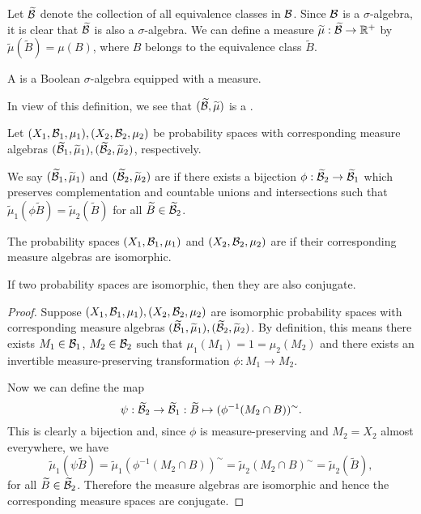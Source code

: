 Let $\widetilde{\mathcal{B}}$ denote the collection of all equivalence classes in $\mathcal{B}$. Since $\mathcal{B}$ is a $\sigma$-algebra, it is clear that $\widetilde{\mathcal{B}}$ is also a $\sigma$-algebra. We can define a measure $\widetilde{\mu} : \widetilde{\mathcal{B}} \to \mathbb{R}^+$ by $\tilde{\mu}(\tilde{B}) = \mu(B)$, where $B$ belongs to the equivalence class $\tilde{B}$.

\begin{definition}
	A  is a Boolean $\sigma$-algebra equipped with a measure.
\end{definition}

In view of this definition, we see that $(\widetilde{\mathcal{B}}, \widetilde{\mu})$ is a .

\begin{definition}
	Let $(X_1, \mathcal{B}_1, \mu_1), (X_2, \mathcal{B}_2, \mu_2)$ be probability spaces with corresponding measure algebras $(\widetilde{\mathcal{B}}_1, \widetilde{\mu}_1), (\widetilde{\mathcal{B}}_2, \widetilde{\mu}_2)$, respectively.
	
	We say $(\widetilde{\mathcal{B}}_1, \widetilde{\mu}_1)$ and $(\widetilde{\mathcal{B}}_2, \widetilde{\mu}_2)$ are  if there exists a bijection $\phi : \widetilde{\mathcal{B}}_2 \to \widetilde{\mathcal{B}}_1$ which preserves complementation and countable unions and intersections such that $\tilde{\mu}_1(\phi \tilde{B}) = \tilde{\mu}_2(\tilde{B})$ for all $\widetilde{B} \in \widetilde{\mathcal{B}}_2$.
	
	The probability spaces $(X_1, \mathcal{B}_1, \mu_1)$ and $(X_2, \mathcal{B}_2, \mu_2)$ are  if their corresponding measure algebras are isomorphic.
\end{definition}

\begin{proposition}
	If two probability spaces are isomorphic, then they are also conjugate.
	\begin{proof}
		Suppose $(X_1, \mathcal{B}_1, \mu_1), (X_2, \mathcal{B}_2, \mu_2)$ are isomorphic probability spaces with corresponding measure algebras $(\widetilde{\mathcal{B}}_1, \widetilde{\mu}_1), (\widetilde{\mathcal{B}}_2, \widetilde{\mu}_2)$. By definition, this means there exists $M_1 \in \mathcal{B}_1$, $M_2 \in \mathcal{B}_2$ such that $\mu_1(M_1) = 1 = \mu_2(M_2)$ and there exists an invertible measure-preserving transformation $\phi: M_1 \to M_2$.
		
		Now we can define the map
		\[
			\psi : \widetilde{\mathcal{B}}_2 \to \widetilde{\mathcal{B}}_1 : \widetilde{B} \mapsto (\phi^{-1}(M_2 \cap B))^\sim.
		\]
		This is clearly a bijection and, since $\phi$ is measure-preserving and $M_2 = X_2$ almost everywhere, we have
		\[
			\tilde{\mu}_1(\psi\tilde{B}) = \tilde{\mu}_1(\phi^{-1}(M_2 \cap B))^\sim = \tilde{\mu}_2(M_2 \cap B)^\sim = \tilde{\mu}_2(\tilde{B}),
		\]
		for all $\widetilde{B} \in \widetilde{\mathcal{B}}_2$. Therefore the measure algebras are isomorphic and hence the corresponding measure spaces are conjugate.
	\end{proof}
\end{proposition}

